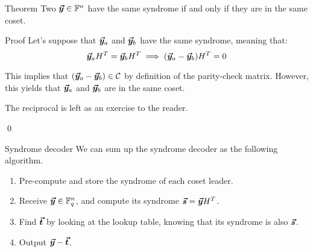 \documentclass[a4paper]{article}
\begin{document}
\begin{parag}{Theorem}
    Two $\bm{\protect\vec{y}} \in \mathbb{F}^n$ have the same syndrome if and only if they are in the same coset.

    \begin{subparag}{Proof}
        Let's suppose that $\bm{\protect\vec{y}}_a$ and $\bm{\protect\vec{y}}_b$ have the same syndrome, meaning that: 
        \[\bvec{y}_a H^T = \bvec{y}_b H^T \implies\left(\bvec{y}_a - \bvec{y}_b\right) H^T = 0\]
        
        This implies that $\left(\bvec{y}_a - \bvec{y}_b\right) \in \mathcal{C}$ by definition of the parity-check matrix. However, this yields that $\bm{\protect\vec{y}}_a$ and $\bm{\protect\vec{y}}_b$ are in the same coset.

        The reciprocal is left as an exercise to the reader.

        \qed
    \end{subparag}
\end{parag}

\begin{parag}{Syndrome decoder}
    We can sum up the syndrome decoder as the following algorithm.

    \begin{enumerate}
        \item Pre-compute and store the syndrome of each coset leader.
        \item Receive $\bm{\protect\vec{y}} \in \mathbb{F}_q^n$, and compute its syndrome $\bm{\protect\vec{s}} = \bm{\protect\vec{y}} H^T$.
        \item Find $\bm{\protect\vec{t}}$ by looking at the lookup table, knowing that its syndrome is also $\bm{\protect\vec{s}}$.
        \item Output $\bm{\protect\vec{y}} - \bm{\protect\vec{t}}$.
    \end{enumerate}
\end{parag}
\end{document}
